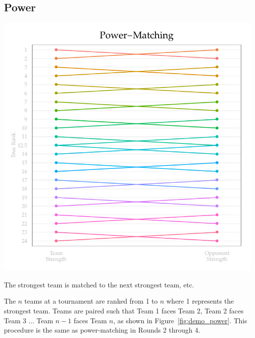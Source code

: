 \documentclass{tufte-handout}
\begin{document}
\subsection{Power}
\begin{marginfigure}[-10\baselineskip]%
  \includegraphics[width=\linewidth]{power-matching_demo.pdf}
  \caption{The strongest team is matched to the next strongest team, etc.}
  \label{fig:demo_power}
\end{marginfigure}

The $n$ teams at a tournament are ranked from 1 to $n$ where 1 represents the strongest team. Teams are paired such that Team 1 faces Team 2, Team 2 faces Team 3 ... Team $n-1$ faces Team $n$, as shown in Figure~\ref{fig:demo_power}. This procedure is the same as power-matching in Rounds 2 through 4.
\end{document}
